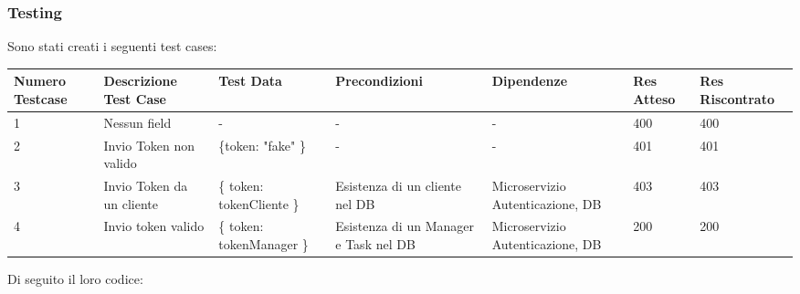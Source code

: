 \documentclass{report}
\begin{document}
\subsubsection*{Testing}

Sono stati creati i seguenti test cases:
\begin{center} %
	\centering
	\begin{tabular}{ |p{1cm}|p{2cm}|p{2cm}|p{2cm}|p{2cm}|p{1cm}|p{1cm}| }
		\hline
		Numero Testcase & Descrizione Test Case     & Test Data                 & Precondizioni                         & Dipendenze                       & Res Atteso & Res Riscontrato \\
		\hline
		1               & Nessun field              & -                         & -                                     & -                                & 400        & 400             \\
		\hline
		2               & Invio Token non valido    & \{token: "fake" \}        & -                                     & -                                & 401        & 401             \\
		\hline
		3               & Invio Token da un cliente & \{ token: tokenCliente \} & Esistenza di un cliente nel DB        & Microservizio Autenticazione, DB & 403        & 403             \\
		\hline
		4               & Invio token valido        & \{ token: tokenManager \} & Esistenza di un Manager e Task nel DB & Microservizio Autenticazione, DB & 200        & 200             \\
		\hline
	\end{tabular}
\end{center}

Di seguito il loro codice:
\end{document}
